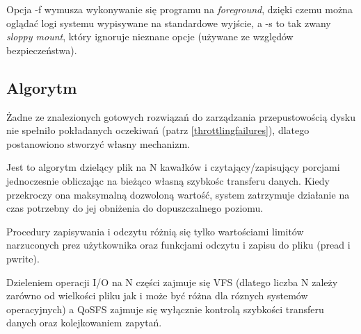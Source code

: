 Opcja -f wymusza wykonywanie się programu na \emph{foreground}, dzięki czemu można
oglądać logi systemu wypisywane na standardowe wyjście, a -s to tak zwany \emph{sloppy mount},
który ignoruje nieznane opcje (używane ze względów bezpieczeństwa).

\subsection{Algorytm}\label{qosalg}
Żadne ze znalezionych gotowych rozwiązań do zarządzania przepustowością dysku nie spełniło
pokładanych oczekiwań (patrz \ref{throttlingfailures}), dlatego postanowiono stworzyć własny mechanizm.

Jest to algorytm dzielący plik na N kawałków i czytający/zapisujący porcjami jednoczesnie obliczając
na bieżąco własną szybkośc transferu danych. Kiedy przekroczy ona maksymalną dozwoloną wartość, system 
zatrzymuje działanie na czas potrzebny do jej obniżenia do dopuszczalnego poziomu.

Procedury zapisywania i odczytu różnią się  tylko wartościami limitów narzuconych prez użytkownika
oraz funkcjami odczytu i zapisu do pliku (pread i pwrite).

Dzieleniem operacji I/O na N części zajmuje się VFS (dlatego liczba N zależy zarówno od wielkości pliku
jak i może być różna dla róznych systemów operacyjnych) 
a QoSFS zajmuje się wyłącznie kontrolą szybkości transferu danych
oraz kolejkowaniem zapytań.

